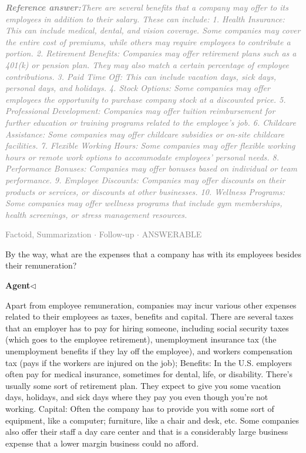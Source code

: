 \documentclass[a4paper,11pt]{article}
\begin{document}
\begin{refanswerenv}
{\footnotesize\textit{\textcolor{gray}{\textbf{Reference answer:}\enspace There are several benefits that a company may offer to its employees in addition to their salary. These can include:
1. Health Insurance: This can include medical, dental, and vision coverage. Some companies may cover the entire cost of premiums, while others may require employees to contribute a portion.
2. Retirement Benefits: Companies may offer retirement plans such as a 401(k) or pension plan. They may also match a certain percentage of employee contributions.
3. Paid Time Off: This can include vacation days, sick days, personal days, and holidays.
4. Stock Options: Some companies may offer employees the opportunity to purchase company stock at a discounted price.
5. Professional Development: Companies may offer tuition reimbursement for further education or training programs related to the employee's job.
6. Childcare Assistance: Some companies may offer childcare subsidies or on-site childcare facilities.
7. Flexible Working Hours: Some companies may offer flexible working hours or remote work options to accommodate employees' personal needs.
8. Performance Bonuses: Companies may offer bonuses based on individual or team performance.
9. Employee Discounts: Companies may offer discounts on their products or services, or discounts at other businesses.
10. Wellness Programs: Some companies may offer wellness programs that include gym memberships, health screenings, or stress management resources.}}}
\end{refanswerenv}
\vspace{0.5em}
\hfill{\tiny\textcolor{gray}{Factoid, Summarization $\cdot$ Follow-up $\cdot$ ANSWERABLE}}
\begin{userbubble}
By the way, what are the expenses that a company has with its employees besides their remuneration?
\end{userbubble}
\noindent\hfill{\small\textcolor{agentcolor}{\textbf{Agent\enspace$\triangleleft$}}}
\begin{agentbubble}
Apart from employee remuneration, companies may incur various other expenses related to their employees as taxes, benefits and capital. There are several taxes that an employer has to pay  for hiring someone, including social security taxes (which goes to the employee retirement), unemployment insurance tax (the unemployment benefits if they lay off the employee), and workers compensation tax (pays if the workers are injured on the job); Benefits: In the U.S. employers often pay for medical insurance, sometimes for dental, life, or disability. There's usually some sort of retirement plan. They expect to give you some vacation days, holidays, and sick days where they pay you even though you're not working.  Capital: Often the company has to provide you with some sort of equipment, like a computer; furniture, like a chair and desk, etc. Some companies also offer their staff a day care center and that is a considerably large business expense that a lower margin business could no afford. 
\end{agentbubble}
\end{document}

